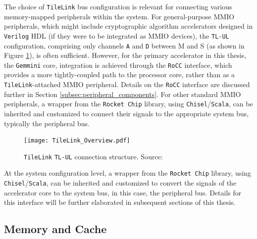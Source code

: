 
The choice of \texttt{TileLink} bus configuration is relevant for connecting various memory-mapped peripherals within the system. For general-purpose MMIO peripherals, which might include cryptographic algorithm accelerators designed in \texttt{Verilog} HDL (if they were to be integrated as MMIO devices), the \texttt{TL-UL} configuration, comprising only channels \texttt{A} and \texttt{D} between M and S (as shown in Figure \ref{fig:tilelink_tl_ul_structure}), is often sufficient. However, for the primary accelerator in this thesis, the \texttt{Gemmini} core, integration is achieved through the \texttt{RoCC} interface, which provides a more tightly-coupled path to the processor core, rather than as a \texttt{TileLink}-attached MMIO peripheral. Details on the \texttt{RoCC} interface are discussed further in Section \ref{subsec:peripheral_components}. For other standard MMIO peripherals, a wrapper from the \texttt{Rocket Chip} library, using \texttt{Chisel}/\texttt{Scala}, can be inherited and customized to connect their signals to the appropriate system bus, typically the peripheral bus.


\begin{figure}[h!]
    \centering
    \texttt{[image: TileLink\_Overview.pdf]} %
    \caption{\texttt{TileLink} \texttt{TL-UL} connection structure. Source: \cite{sifive2018tilelink}}
    \label{fig:tilelink_tl_ul_structure}
\end{figure}

At the system configuration level, a wrapper from the \texttt{Rocket Chip} library, using \texttt{Chisel}/\texttt{Scala}, can be inherited and customized to convert the signals of the accelerator core to the system bus, in this case, the peripheral bus. Details for this interface will be further elaborated in subsequent sections of this thesis.

\subsection{Memory and Cache}
\label{subsec:memory_cache}

